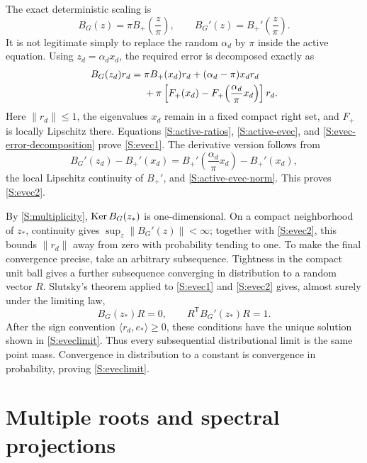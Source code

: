 The exact deterministic scaling is
\begin{equation}
B_G(z)=\pi B_+\!\left(\frac z\pi\right),
\qquad
B_G'(z)=B_+'\!\left(\frac z\pi\right).
\label{S:B-scaling}
\end{equation}
It is not legitimate simply to replace the random $\alpha_d$ by $\pi$
inside the active equation. Using $z_d=\alpha_dx_d$, the required error is
decomposed exactly as
\begin{align}
B_G(z_d)r_d
={}&
\pi B_+(x_d)r_d
+(\alpha_d-\pi)x_dr_d \notag\\
&+\pi\left[
F_+(x_d)-F_+\!\left(\frac{\alpha_d}{\pi}x_d\right)
\right]r_d.
\label{S:evec-error-decomposition}
\end{align}
Here $\|r_d\|\le1$, the eigenvalues $x_d$ remain in a fixed compact right
set, and $F_+$ is locally Lipschitz there. Equations
\eqref{S:active-ratios}, \eqref{S:active-evec}, and
\eqref{S:evec-error-decomposition} prove \eqref{S:evec1}. The derivative
version follows from
\begin{equation}
B_G'(z_d)-B_+'(x_d)
=
B_+'\!\left(\frac{\alpha_d}{\pi}x_d\right)-B_+'(x_d),
\end{equation}
the local Lipschitz continuity of $B_+'$, and
\eqref{S:active-evec-norm}. This proves \eqref{S:evec2}.

By \eqref{S:multiplicity}, $\operatorname{Ker} B_G(z_*)$ is one-dimensional. On a compact
neighborhood of $z_*$, continuity gives $\sup_z\|B_G'(z)\|<\infty$; together
with \eqref{S:evec2}, this bounds $\|r_d\|$ away from zero with probability
tending to one. To make the final convergence precise, take an arbitrary
subsequence. Tightness in the compact unit ball gives a further subsequence
converging in distribution to a random vector $R$. Slutsky's theorem applied
to \eqref{S:evec1} and \eqref{S:evec2} gives, almost surely under the limiting
law,
\begin{equation}
B_G(z_*)R=0,
\qquad
R^{\mathsf T}B_G'(z_*)R=1.
\end{equation}
After the sign convention $\langle r_d,e_*\rangle\ge0$, these conditions
have the unique solution shown in \eqref{S:eveclimit}. Thus every
subsequential distributional limit is the same point mass. Convergence in
distribution to a constant is convergence in probability, proving
\eqref{S:eveclimit}.


\section{Multiple roots and spectral projections}
\label{S:multiple-section}

